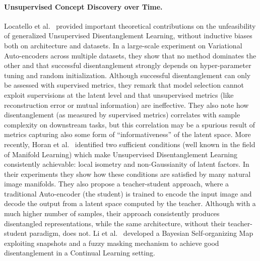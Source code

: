 \paragraph{Unsupervised Concept Discovery over Time.} Locatello et al.~\cite{locatello2019challenging} provided important theoretical contributions on the unfeasibility of generalized Unsupervised Disentanglement Learning, without inductive biases both on architecture and datasets. In a large-scale experiment on Variational Auto-encoders across multiple datasets, they show that no method dominates the other and that successful disentanglement strongly depends on hyper-parameter tuning and random initialization. Although successful disentanglement can only be assessed with supervised metrics, they remark that model selection cannot exploit supervisions at the latent level and that unsupervised metrics (like reconstruction error or mutual information) are ineffective.
They also note how %
disentanglement (as measured by supervised metrics) correlates with sample complexity on downstream tasks, but this correlation may be a spurious result of metrics capturing also some form of ``informativeness'' of the latent space.
%
More recently, Horan et al.~\cite{horan2021unsupervised} identified two sufficient conditions (well known in the field of Manifold Learning) which make Unsupervised Disentanglement Learning consistently achievable: local isometry and non-Gaussianity of latent factors. In their experiments they show how these conditions are satisfied by many natural image manifolds.%
%
They also propose a teacher-student approach, where a traditional Auto-encoder (the student) is trained to encode the input image and decode the output from a latent space computed by the teacher. %
%
Although with a much higher number of samples, their approach consistently produces disentangled representations, while the same architecture, without their teacher-student paradigm, does not.
Li et al.~\cite{li2022continual} developed a Bayesian Self-organizing Map exploiting snapshots and a fuzzy masking mechanism to achieve good disentanglement in a Continual Learning setting. %
